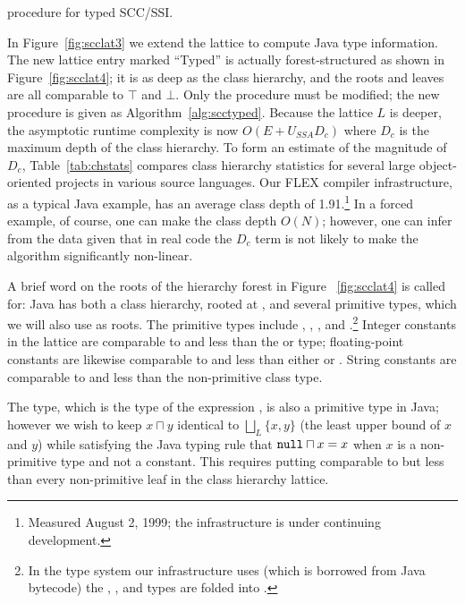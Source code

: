 \documentclass[12pt,titlepage,twoside]{article}
\newcommand{\meet}{\ensuremath{\sqcap}}
\begin{document}
\begin{myalgorithm}\small

\caption{ procedure for typed SCC/SSI.}
\label{alg:scctyped}
\end{myalgorithm}
In Figure~\ref{fig:scclat3} we extend the lattice to compute Java type
information.  The new lattice entry marked ``Typed'' is actually
forest-structured as shown in Figure~\ref{fig:scclat4}; it is as deep
as the class hierarchy, and the roots and leaves are all comparable to
$\top$ and $\bot$.  Only the  procedure must be modified;
the new procedure is given as Algorithm~\ref{alg:scctyped}.
Because the lattice $L$ is
deeper, the asymptotic runtime complexity is now $O(E+U_{SSA}D_c)$
where $D_c$ is the maximum depth of the class hierarchy.  
To form an estimate of the magnitude of $D_c$, Table~\ref{tab:chstats}
compares class hierarchy statistics for several large
object-oriented projects in various source languages. Our FLEX
compiler infrastructure, as a typical Java example, has an average
class depth of 1.91.\footnote{Measured August 2, 1999; the
infrastructure is under continuing development.}
In a forced example, of course, one can make the class depth $O(N)$;
however, one can infer from the data given that in real code the $D_c$
term is not likely to make the algorithm significantly non-linear.

A brief word on the roots of the hierarchy forest in Figure~%
\ref{fig:scclat4} is called for: Java has both a class hierarchy,
rooted at , and several primitive types, which
we will also use as roots.  The primitive types include
, , , and
.\footnote{In the type system our infrastructure uses
(which is borrowed from Java bytecode) the ,
,  and  types are folded into
.}  Integer constants in the lattice are comparable to and
less than the  or  type; floating-point constants
are likewise comparable to and less than either  or
.  String constants are comparable to and less than the
 non-primitive class type.

The  type, which is the type of the expression ,
is also a primitive type in Java; however we wish to keep $x \meet y$
identical to $\bigsqcup_L\{x, y\}$ (the least upper bound of $x$ and
$y$) while satisfying the Java typing rule that $\code{null} \meet x = x$
when $x$ is a non-primitive type and not a constant.  This requires
putting  comparable to but less than every non-primitive
leaf in the class hierarchy lattice.
\end{document}
